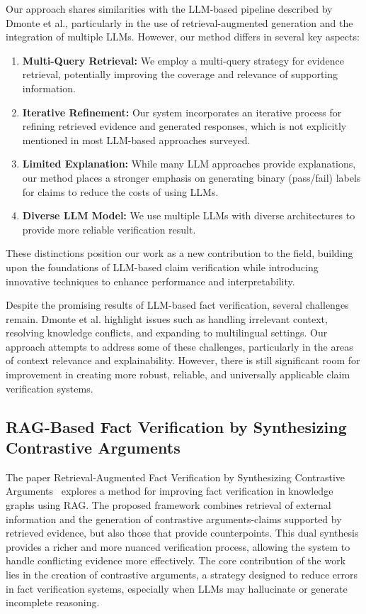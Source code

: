Our approach shares similarities with the LLM-based pipeline described by Dmonte et al., particularly in the use of retrieval-augmented generation and the integration of multiple LLMs. However, our method differs in several key aspects:
\begin{enumerate}
    \item \textbf{Multi-Query Retrieval:} We employ a multi-query strategy for evidence retrieval, potentially improving the coverage and relevance of supporting information.
    \item \textbf{Iterative Refinement:} Our system incorporates an iterative process for refining retrieved evidence and generated responses, which is not explicitly mentioned in most LLM-based approaches surveyed.
    \item \textbf{Limited Explanation:} While many LLM approaches provide explanations, our method places a stronger emphasis on generating binary (pass/fail) labels for claims to reduce the costs of using LLMs.
    \item \textbf{Diverse LLM Model:} We use multiple LLMs with diverse architectures to provide more reliable verification result.
\end{enumerate}

These distinctions position our work as a new contribution to the field, building upon the foundations of LLM-based claim verification while introducing innovative techniques to enhance performance and interpretability.

Despite the promising results of LLM-based fact verification, several challenges remain.
Dmonte et al. highlight issues such as handling irrelevant context, resolving knowledge conflicts, and expanding to multilingual settings. Our approach attempts to address some of these challenges, particularly in the areas of context relevance and explainability. However, there is still significant room for improvement in creating more robust, reliable, and universally applicable claim verification systems.

\subsection{RAG-Based Fact Verification by Synthesizing Contrastive Arguments}\label{subsec:retrieval-augmented-fact-verification}
The paper Retrieval-Augmented Fact Verification by Synthesizing Contrastive Arguments~\cite{yue2024retrievalaugmentedfactverification} explores a method for improving fact verification in knowledge graphs using RAG.
The proposed framework combines retrieval of external information and the generation of contrastive arguments-claims supported by retrieved evidence, but also those that provide counterpoints.
This dual synthesis provides a richer and more nuanced verification process, allowing the system to handle conflicting evidence more effectively.
The core contribution of the work lies in the creation of contrastive arguments, a strategy designed to reduce errors in fact verification systems, especially when LLMs may hallucinate or generate incomplete reasoning.

